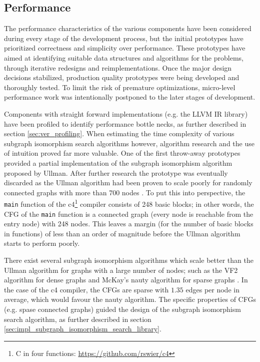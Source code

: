 
\subsection{Performance}

The performance characteristics of the various components have been considered during every stage of the development process, but the initial prototypes have prioritized correctness and simplicity over performance. These prototypes have aimed at identifying suitable data structures and algorithms for the problems, through iterative redesigns and reimplementations. Once the major design decisions stabilized, production quality prototypes were being developed and thoroughly tested. To limit the risk of premature optimizations, micro-level performance work was intentionally postponed to the later stages of development.

Components with straight forward implementations (e.g. the LLVM IR library) have been profiled to identify performance bottle necks, as further described in section \ref{sec:ver_profiling}. When estimating the time complexity of various subgraph isomorphism search algorithms however, algorithm research and the use of intuition proved far more valuable. One of the first throw-away prototypes provided a partial implementation of the subgraph isomorphism algorithm proposed by Ullman. After further research the prototype was eventually discarded as the Ullman algorithm had been proven to scale poorly for randomly connected graphs with more than 700 nodes \cite{iso_performance_comparison}. To put this into perspective, the \texttt{main} function of the c4\footnote{C in four functions: \url{https://github.com/rswier/c4}} compiler consists of 248 basic blocks; in other words, the CFG of the \texttt{main} function is a connected graph (every node is reachable from the entry node) with 248 nodes. This leaves a margin (for the number of basic blocks in functions) of less than an order of magnitude before the Ullman algorithm starts to perform poorly.

There exist several subgraph isomorphism algorithms which scale better than the Ullman algorithm for graphs with a large number of nodes; such as the VF2 algorithm for dense graphs and McKay's nauty algorithm for sparse graphs \cite{iso_performance_comparison,subgraph_isomorphism_algorithms}. In the case of the c4 compiler, the CFGs are sparse with $ 1.35 $ edges per node in average, which would favour the nauty algorithm. The specific properties of CFGs (e.g. spase connected graphs) guided the design of the subgraph isomorphism search algorithm, as further described in section \ref{sec:impl_subgraph_isomorphism_search_library}.

